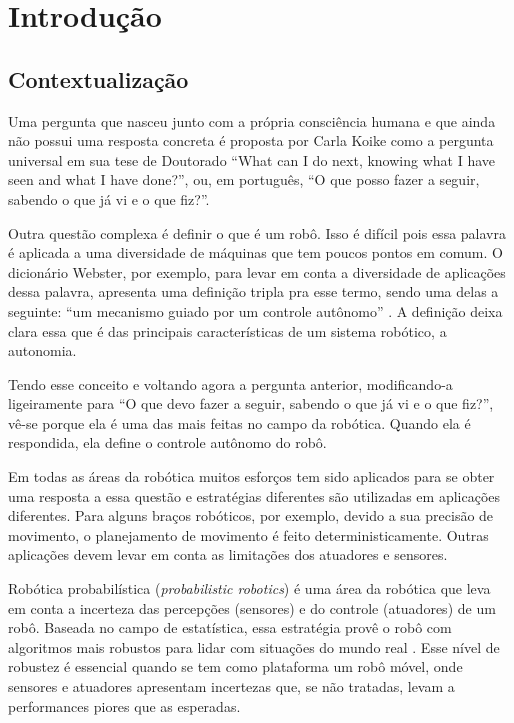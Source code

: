 
\chapter{Introdução} \label{Chap:Intro}


\section{Contextualização}

Uma pergunta que nasceu junto com a própria consciência humana e que ainda não possui uma resposta concreta é proposta por Carla Koike como a pergunta universal em sua tese de Doutorado \cite{Koike:2005} ``What can I do next, knowing what I have seen and what I have done?'', ou, em português, ``O que posso fazer a seguir, sabendo o que já vi e o que fiz?''.

Outra questão complexa é definir o que é um robô. Isso é difícil pois essa palavra é aplicada a uma diversidade de máquinas que tem poucos pontos em comum. O dicionário Webster, por exemplo, para levar em conta a diversidade de aplicações dessa palavra, apresenta uma definição tripla pra esse termo, sendo uma delas a seguinte: ``um mecanismo guiado por um controle autônomo'' \cite{Fievet_2002}. A definição deixa clara essa que é das principais características de um sistema robótico, a autonomia.

Tendo esse conceito e voltando agora a pergunta anterior, modificando-a ligeiramente para ``O que devo fazer a seguir, sabendo o que já vi e o que fiz?'', vê-se porque ela é uma das mais feitas no campo da robótica. Quando ela é respondida, ela define o controle autônomo do robô.

Em todas as áreas da robótica muitos esforços tem sido aplicados para se obter uma resposta a essa questão e estratégias diferentes são utilizadas em aplicações diferentes. Para alguns braços robóticos, por exemplo, devido a sua precisão de movimento, o planejamento de movimento é feito deterministicamente. Outras aplicações devem levar em conta as limitações dos atuadores e sensores.

Robótica probabilística (\textit{probabilistic robotics}) é uma área da robótica que leva em conta a incerteza das percepções (sensores) e do controle (atuadores) de um robô. Baseada no campo de estatística, essa estratégia provê o robô com algoritmos mais robustos para lidar com situações do mundo real \cite{Thrun:2005:PR:1121596}. Esse nível de robustez é essencial quando se tem como plataforma um robô móvel, onde sensores e atuadores apresentam incertezas que, se não tratadas, levam a performances piores que as esperadas.

